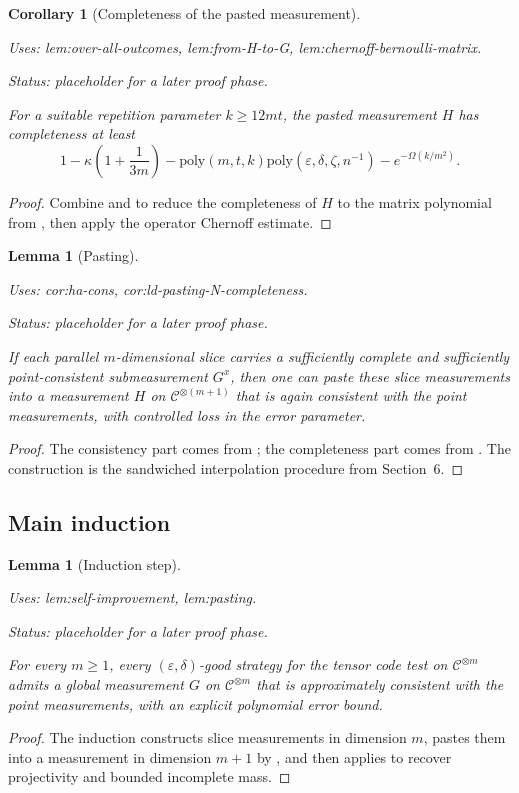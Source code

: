 \documentclass{article}
\providecommand{\uses}[1]{\par\smallskip\noindent\emph{Uses:} #1.\par\smallskip}
\providecommand{\notready}{\par\smallskip\noindent\emph{Status: placeholder for a later proof phase.}\par\smallskip}
\newtheorem{lemma}[definition]{Lemma}
\newtheorem{corollary}[definition]{Corollary}
\theoremstyle{remark}
\newcommand{\code}{\mathcal{C}}
\newcommand{\eps}{\varepsilon}
\begin{document}
\begin{corollary}[Completeness of the pasted measurement]\label{cor:ld-pasting-N-completeness}
  \uses{lem:over-all-outcomes, lem:from-H-to-G, lem:chernoff-bernoulli-matrix}
  \notready
  For a suitable repetition parameter $k\ge 12mt$, the pasted measurement $H$ has completeness at least
  \[
    1-\kappa\left(1+\frac{1}{3m}\right)-\text{poly}(m,t,k) \text{poly}(\eps,\delta,\zeta,n^{-1})-e^{-\Omega(k/m^2)}.
  \]
\end{corollary}
\begin{proof}
  Combine  and  to reduce the completeness of $H$ to the matrix polynomial from , then apply the operator Chernoff estimate.
\end{proof}

\begin{lemma}[Pasting]\label{lem:pasting}
  \uses{cor:ha-cons, cor:ld-pasting-N-completeness}
  \notready
  If each parallel $m$-dimensional slice carries a sufficiently complete and sufficiently point-consistent submeasurement $G^x$, then one can paste these slice measurements into a measurement $H$ on $\code^{\otimes (m+1)}$ that is again consistent with the point measurements, with controlled loss in the error parameter.
\end{lemma}
\begin{proof}
  The consistency part comes from ; the completeness part comes from . The construction is the sandwiched interpolation procedure from Section~6.
\end{proof}

\subsection{Main induction}

\begin{lemma}[Induction step]\label{lem:induction}
  \uses{lem:self-improvement, lem:pasting}
  \notready
  For every $m\ge 1$, every $(\eps,\delta)$-good strategy for the tensor code test on $\code^{\otimes m}$ admits a global measurement $G$ on $\code^{\otimes m}$ that is approximately consistent with the point measurements, with an explicit polynomial error bound.
\end{lemma}
\begin{proof}
  The induction constructs slice measurements in dimension $m$, pastes them into a measurement in dimension $m+1$ by , and then applies  to recover projectivity and bounded incomplete mass.
\end{proof}
\end{document}
